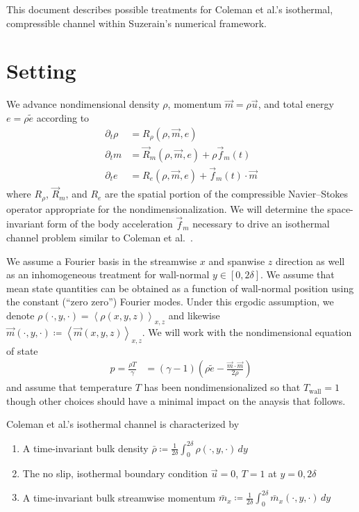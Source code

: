 \documentclass[letterpaper,11pt,nointlimits,reqno]{amsart}
\begin{document}
This document describes possible treatments for Coleman et al.'s isothermal,
compressible channel within Suzerain's numerical framework.

\section{Setting}

We advance nondimensional density $\rho$, momentum $\vec{m}=\rho{}\vec{u}$, and
total energy $e = \rho{}\tilde{e}$ according to
\begin{subequations}
\begin{align}
  \partial_{t} \rho{} &= R_{\rho}\!\left(\rho,\vec{m},e\right)
  \\
  \partial_{t} m      &= \vec{R}_{m}\!\left(\rho,\vec{m},e\right)
                       + \rho \vec{f}_{m}(t)
  \\
  \partial_{t} e      &= R_{e}\!\left(\rho,\vec{m},e\right)
                       + \vec{f}_{m}(t) \cdot \vec{m}
\end{align}
\end{subequations}
where $R_{\rho}$, $\vec{R}_{m}$, and $R_{e}$ are the spatial portion of the
compressible Navier--Stokes operator appropriate for the nondimensionalization.
We will determine the space-invariant form of the body acceleration
$\vec{f}_{m}$ necessary to drive an isothermal channel problem similar to
Coleman et al.~\cite{Coleman1995Numerical}.

We assume a Fourier basis in the streamwise $x$ and spanwise $z$ direction as
well as an inhomogeneous treatment for wall-normal
$y\in\left[0,2\delta\right]$.  We assume that mean state quantities can be
obtained as a function of wall-normal position using the constant (``zero
zero'') Fourier modes.  Under this ergodic assumption, we denote
$\rho\!\left(\cdot,y,\cdot\right) =
\left<\rho\left(x,y,z\right)\right>_{x,z}$ and likewise
$\vec{m}\!\left(\cdot,y,\cdot\right) \coloneqq
\left<\vec{m}\left(x,y,z\right)\right>_{x,z}$.  We will work with the
nondimensional equation of state
\begin{align}
  p  = \frac{\rho{}T}{\gamma}
    &= \left(\gamma-1\right)
       \left( \rho\tilde{e} - \frac{\vec{m}\cdot\vec{m}}{2\rho} \right)
\end{align}
and assume that temperature $T$ has been nondimensionalized so that
$T_\text{wall}=1$ though other choices should have a minimal impact on
the anaysis that follows.

Coleman et al.'s isothermal channel is characterized by
\begin{enumerate}
  \item A time-invariant bulk density $\bar{\rho} \coloneqq \frac{1}{2\delta}
        \int_{0}^{2\delta} \rho\!\left(\cdot,y,\cdot\right)\,dy $
  \item The no slip, isothermal boundary condition
        $\vec{u}=0$, $T = 1$ at $y = 0,2\delta$
  \item A time-invariant bulk streamwise momentum
        $\bar{m}_{x} \coloneqq \frac{1}{2\delta}
        \int_{0}^{2\delta} \bar{m}_{x}\!\left(\cdot,y,\cdot\right)\,dy $
\end{enumerate}
\end{document}

